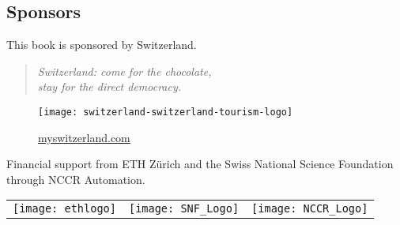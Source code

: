 
\vfill
\subsection{Sponsors}

This book is sponsored by Switzerland.

\begin{quote}\centering
    \itshape
    Switzerland: come for the chocolate,\\
    stay for the direct democracy.
\end{quote}

\begin{figure}[h]
    \centering
    \texttt{[image: switzerland-switzerland-tourism-logo]}

    \href{http://myswitzerland.com}{myswitzerland.com}
\end{figure}


Financial support from ETH Zürich and the Swiss National Science Foundation through NCCR Automation.

\begin{figure*}
    \begin{tabular}{ccc}
        \texttt{[image: ethlogo]} & \texttt{[image: SNF\_Logo]} & \texttt{[image: NCCR\_Logo]}
    \end{tabular}
\end{figure*}

\vfill